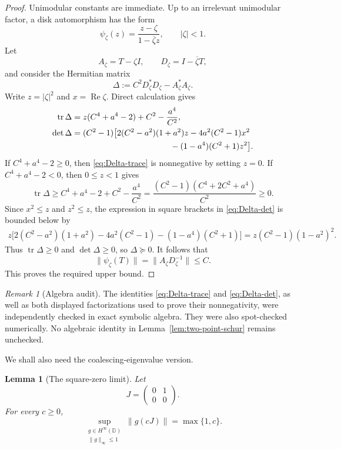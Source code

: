 \documentclass[11pt]{article}
\newtheorem{lemma}[theorem]{Lemma}
\theoremstyle{remark}
\newtheorem{remark}[theorem]{Remark}
\begin{document}
\begin{proof}
Unimodular constants are immediate.  Up to an irrelevant unimodular
factor, a disk automorphism has the form
\[
  \psi_\zeta(z)=\frac{z-\zeta}{1-\overline{\zeta}z},
  \qquad |\zeta|<1.
\]
Let
\[
  A_\zeta=T-\zeta I,\qquad
  D_\zeta=I-\overline{\zeta}T,
\]
and consider the Hermitian matrix
\[
  \Delta
  :=C^2D_\zeta^*D_\zeta-A_\zeta^*A_\zeta.
\]
Write \(z=|\zeta|^2\) and \(x=\operatorname{Re}\zeta\).  Direct
calculation gives
\begin{align}
  \operatorname{tr}\Delta
  &=
  z(C^4+a^4-2)+C^2-\frac{a^4}{C^2},
  \label{eq:Delta-trace}\\
  \det\Delta
  &=(C^2-1)
  \bigl[
       2(C^2-a^2)(1+a^2)z
       -4a^2(C^2-1)x^2 \notag\\
  &\hspace{42mm}
       -(1-a^4)(C^2+1)z^2
  \bigr].
  \label{eq:Delta-det}
\end{align}
If \(C^4+a^4-2\geq 0\), then \eqref{eq:Delta-trace} is nonnegative
by setting \(z=0\).  If \(C^4+a^4-2<0\), then \(0\leq z<1\) gives
\[
  \operatorname{tr}\Delta
  \geq
  C^4+a^4-2+C^2-\frac{a^4}{C^2}
  =
  \frac{(C^2-1)(C^4+2C^2+a^4)}{C^2}
  \geq 0.
\]
Since \(x^2\leq z\) and \(z^2\leq z\), the expression in square
brackets in \eqref{eq:Delta-det} is bounded below by
\begin{align*}
  z\bigl[
       2(C^2-a^2)(1+a^2)
       -4a^2(C^2-1)
       -(1-a^4)(C^2+1)
    \bigr]
  =z(C^2-1)(1-a^2)^2.
\end{align*}
Thus \(\operatorname{tr}\Delta\geq 0\) and
\(\det\Delta\geq 0\), so \(\Delta\succeq 0\).  It follows that
\[
  \|\psi_\zeta(T)\|
  =\|A_\zeta D_\zeta^{-1}\|
  \leq C.
\]
This proves the required upper bound.
\end{proof}

\begin{remark}[Algebra audit]
\label{rem:algebra-audit}
The identities \eqref{eq:Delta-trace} and \eqref{eq:Delta-det}, as
well as both displayed factorizations used to prove their
nonnegativity, were independently checked in exact symbolic algebra.
They were also spot-checked numerically.  No algebraic identity in
Lemma~\ref{lem:two-point-schur} remains unchecked.
\end{remark}

We shall also need the coalescing-eigenvalue version.

\begin{lemma}[The square-zero limit]
\label{lem:square-zero-schur}
Let
\[
  J=
  \begin{pmatrix}
    0&1\\
    0&0
  \end{pmatrix}.
\]
For every \(c\geq 0\),
\[
  \sup_{\substack{g\in H^\infty(\mathbb D)\\
                  \|g\|_\infty\leq 1}}
       \|g(cJ)\|
  =\max\{1,c\}.
\]
\end{lemma}
\end{document}
